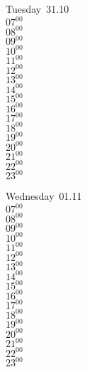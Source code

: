 \documentclass[11pt, a4paper]{book}\usepackage[]{graphicx}\usepackage[]{color}
\begin{document}
\begin{weekdaybox}
  Tuesday~31.10\\
  { 
  \vfill
  $07^{00}$\\
$08^{00}$\\
$09^{00}$\\
$10^{00}$\\
$11^{00}$\\
$12^{00}$\\
$13^{00}$\\
$14^{00}$\\
$15^{00}$\\
$16^{00}$\\
$17^{00}$\\
$18^{00}$\\
$19^{00}$\\
$20^{00}$\\
$21^{00}$\\
$22^{00}$\\
$23^{00}$\\
  }
\end{weekdaybox}
\begin{weekdaybox}
  Wednesday~01.11\\
  { 
  \vfill
  $07^{00}$\\
$08^{00}$\\
$09^{00}$\\
$10^{00}$\\
$11^{00}$\\
$12^{00}$\\
$13^{00}$\\
$14^{00}$\\
$15^{00}$\\
$16^{00}$\\
$17^{00}$\\
$18^{00}$\\
$19^{00}$\\
$20^{00}$\\
$21^{00}$\\
$22^{00}$\\
$23^{00}$\\
  }
\end{weekdaybox}
\clearpage
\begin{headerbox}
\end{headerbox}
\end{document}
